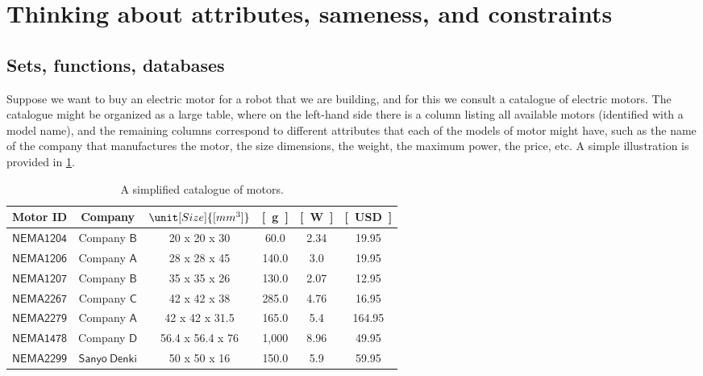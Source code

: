 \section{Thinking about attributes, sameness, and constraints}


\subsection{Sets, functions, databases}

Suppose we want to buy an electric motor for a robot that we are building, and for this we consult a catalogue of electric motors. The catalogue might be organized as a large table, where on the left-hand side there is a column listing all available motors (identified with a model name), and the remaining columns correspond to different attributes that each of the models of motor might have, such as the name of the company that manufactures the motor, the size dimensions, the weight, the maximum power, the price, etc. A simple illustration is provided in \cref{tab:currencycompanies}.
\begin{table}[h]
    \centering
    \begin{tabular}{c|c|c|c|c|c}
         Motor ID & Company& $\unit[Size]{[mm^3]}$ & \unit[Weight]{[g]} & \unit[Max Power]{[W]} & \unit[price]{[USD]} \\
         \hline
         $\mathsf{NEMA1204}$&Company $\mathsf{B}$ & 20 x 20 x 30& 60.0 &2.34 &19.95\\
         $\mathsf{NEMA1206}$&Company $\mathsf{A}$ &28 x 28 x 45& 140.0 &3.0 &19.95\\
         $\mathsf{NEMA1207}$&Company $\mathsf{B}$ &35 x 35 x 26& 130.0 &2.07 &12.95\\
         $\mathsf{NEMA2267}$&Company $\mathsf{C}$ &42 x 42 x 38& 285.0 &4.76 &16.95\\
         $\mathsf{NEMA2279}$&Company $\mathsf{A}$ &42 x 42 x 31.5& 165.0  &5.4 & 164.95\\
        $\mathsf{NEMA1478}$&Company $\mathsf{D}$ & 56.4 x 56.4 x 76& 1,000 & 8.96&49.95\\
        $\mathsf{NEMA2299}$&$\mathsf{Sanyo\ Denki}$ & 50 x 50 x 16& 150.0 &5.9&59.95
    \end{tabular}
    \caption{A simplified catalogue of motors.}
    \label{tab:currencycompanies}
\end{table}

